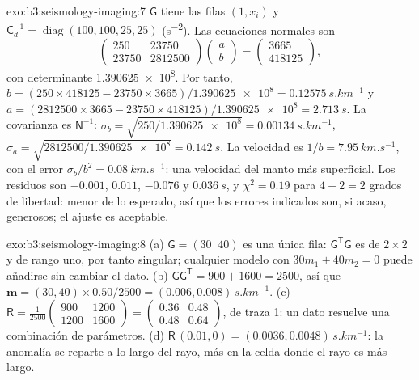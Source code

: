 \begin{solution}{exo:b3:seismology-imaging:7}
$\mathsf G$ tiene las filas $(1, x_i)$ y $\mathsf C_d^{-1} = \operatorname{diag}
(100, 100, 25, 25)$ (\unit{s^{-2}}). Las ecuaciones normales son
\[
  \begin{pmatrix} 250 & 23750 \\ 23750 & \num{2812500} \end{pmatrix}
  \begin{pmatrix} a \\ b \end{pmatrix}
  = \begin{pmatrix} 3665 \\ 418125 \end{pmatrix},
\]
con determinante \num{1.390625e8}. Por tanto, $b = (250\times418125 -
23750\times3665)/\num{1.390625e8} = \qty{0.12575}{s.km^{-1}}$ y
$a = (2812500\times3665 - 23750\times418125)/\num{1.390625e8} =
\qty{2.713}{s}$. La covarianza es $\mathsf N^{-1}$: $\sigma_b =
\sqrt{250/\num{1.390625e8}} = \qty{0.00134}{s.km^{-1}}$, $\sigma_a =
\sqrt{2812500/\num{1.390625e8}} = \qty{0.142}{s}$. La velocidad es
$1/b = \qty{7.95}{km.s^{-1}}$, con el error $\sigma_b/b^2 =
\qty{0.08}{km.s^{-1}}$: una velocidad del manto más superficial. Los residuos son $-0.001$,
$0.011$, $-0.076$ y $\qty{0.036}{s}$, y $\chi^2 = 0.19$ para $4 - 2 = 2$
grados de libertad: menor de lo esperado, así que los errores indicados son, si acaso,
generosos; el ajuste es aceptable.
\end{solution}

\begin{solution}{exo:b3:seismology-imaging:8}
(a) $\mathsf G = (30\;\;40)$ es una única fila: $\mathsf G^{\mathsf T}\mathsf G$ es
de $2\times2$ y de rango uno, por tanto singular; cualquier modelo con $30m_1 + 40m_2 = 0$ puede
añadirse sin cambiar el dato. (b) $\mathsf G\mathsf G^{\mathsf T} =
900 + 1600 = 2500$, así que $\mathbf m = (30, 40)\times0.50/2500 =
(0.006, 0.008)\,\unit{s.km^{-1}}$. (c) $\mathsf R = \frac{1}{2500}
\begin{pmatrix} 900 & 1200 \\ 1200 & 1600 \end{pmatrix} =
\begin{pmatrix} 0.36 & 0.48 \\ 0.48 & 0.64 \end{pmatrix}$, de traza 1: un dato
resuelve una combinación de parámetros. (d) $\mathsf R\,(0.01, 0) =
(0.0036, 0.0048)\,\unit{s.km^{-1}}$: la anomalía se reparte a lo largo del rayo, más
en la celda donde el rayo es más largo.
\end{solution}

